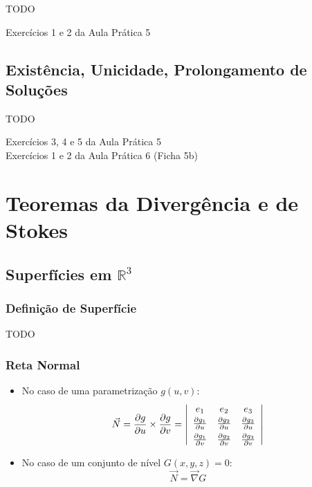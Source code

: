 \documentclass[11pt, a4paper]{article}
\begin{document}
TODO

Exercícios 1 e 2 da Aula Prática 5

\subsection{Existência, Unicidade, Prolongamento de Soluções}

TODO

Exercícios 3, 4 e 5 da Aula Prática 5 \\
Exercícios 1 e 2 da Aula Prática 6 (Ficha 5b)

\newpage

\section{Teoremas da Divergência e de Stokes}

\subsection{Superfícies em $\mathbb{R}^3$}

\subsubsection{Definição de Superfície}

TODO

\subsubsection{Reta Normal}

\begin{itemize}
    \item No caso de uma parametrização $g(u,v)$:
          \begin{equation*}
              \vec{N} = \frac{\partial g}{\partial u} \times \frac{\partial g}{\partial v}
              = \left\vert
              \begin{array}{c c c}
                  e_1                             & e_2 & e_3 \\[2pt]
                  \frac{\partial g_1}{\partial u} &
                  \frac{\partial g_2}{\partial u} &
                  \frac{\partial g_3}{\partial u}             \\[4pt]
                  \frac{\partial g_1}{\partial v} &
                  \frac{\partial g_2}{\partial v} &
                  \frac{\partial g_3}{\partial v}
              \end{array}
              \right\vert
          \end{equation*}
    \item No caso de um conjunto de nível $G(x, y, z) = 0$:
          \begin{equation*}
              \vec{N} = \vec{\nabla} G
          \end{equation*}
\end{itemize}
\end{document}

